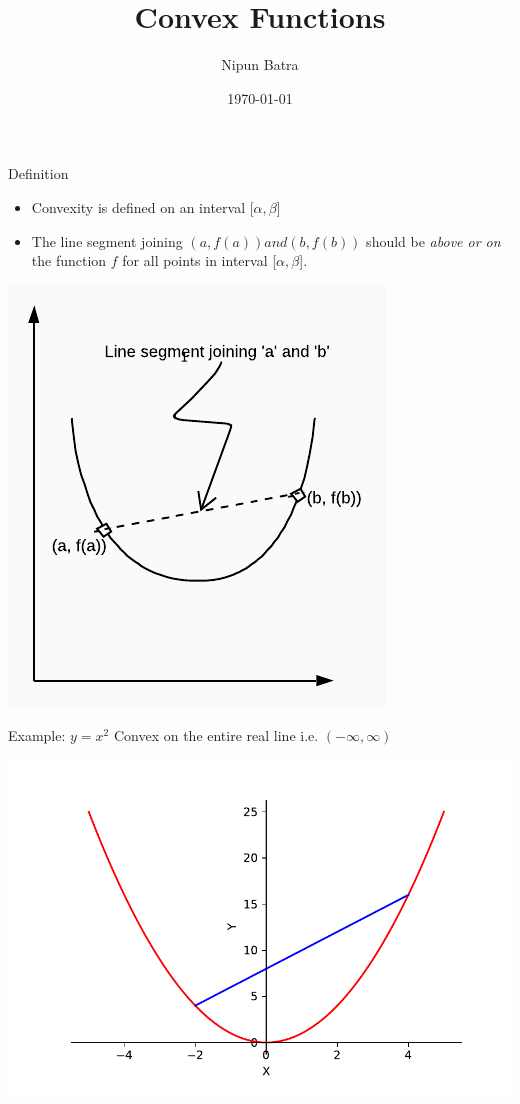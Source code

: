 \documentclass{beamer}
\title{Convex Functions}
\date{\today}
\author{Nipun Batra}
\institute{IIT Gandhinagar}
\begin{document}
	\maketitle

	\begin{frame}{Definition}
	\begin{itemize}
	\item Convexity is defined on an interval [$\alpha,\beta$]
	\item The line segment joining $(a,f(a)) and (b, f(b))$ should be \textit{above or on} the function $f$ for all points in interval  [$\alpha,\beta$].
	\end{itemize}
	\begin{center}
	\includegraphics[scale=0.8]{fig1}
	\end{center}
	\end{frame}
	
	\begin{frame}{Example: $y = x^2$}
	Convex on the entire real line i.e. $(-\infty, \infty)$
	\begin{center}
	\includegraphics[scale=0.5]{y-x2}
	\end{center}
	\end{frame}
\end{document}
